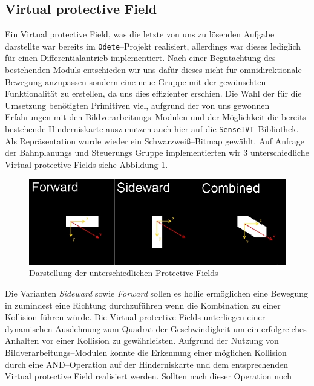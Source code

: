 \subsection{Virtual protective Field}
\label{sec:vpf}
Ein Virtual protective Field, was die letzte von uns zu lösenden Aufgabe
darstellte war bereits im \lstinline{Odete}--Projekt realisiert,
 allerdings war dieses lediglich für einen Differentialantrieb implementiert.
 Nach einer Begutachtung des bestehenden Moduls entschieden wir uns dafür
 dieses nicht für omnidirektionale Bewegung anzupassen sondern eine neue Gruppe mit der gewünschten Funktionalität
 zu erstellen, da uns dies effizienter erschien. Die Wahl der für die Umsetzung benötigten Primitiven viel, aufgrund
 der von uns gewonnen Erfahrungen mit den Bildverarbeitungs--Modulen und der Möglichkeit die bereits bestehende
 Hinderniskarte auszunutzen auch hier auf die \lstinline{SenseIVT}--Bibliothek.
 Als Repräsentation wurde wieder ein Schwarzweiß--Bitmap gewählt. Auf Anfrage der
 Bahnplanungs und Steuerungs Gruppe implementierten wir 3 unterschiedliche
 Virtual protective Fields siehe Abbildung \ref{fig:virtualprotectivefields}.
 \begin{figure}[h]
\center
\includegraphics[scale=0.5]{graphics/virtualprotectivefields.jpg}
\caption{\label{fig:virtualprotectivefields} Darstellung der unterschiedlichen Protective
Fields}
\end{figure}
 Die Varianten \emph{Sideward} sowie \emph{Forward} sollen es \gls{hollie}
 ermöglichen eine Bewegung in zumindest eine Richtung durchzuführen wenn die Kombination zu einer Kollision führen würde.
 Die Virtual protective Fields unterliegen einer dynamischen Ausdehnung zum
 Quadrat der Geschwindigkeit um ein erfolgreiches Anhalten vor einer Kollision zu gewährleisten. Aufgrund der Nutzung von Bildverarbeitungs--Modulen
 konnte die Erkennung einer möglichen Kollision durch eine AND--Operation auf der Hinderniskarte und dem entsprechenden
 Virtual protective Field realisiert werden. Sollten nach dieser Operation noch
